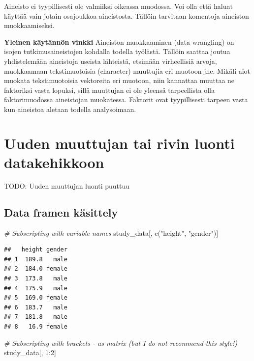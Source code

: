 \documentclass[
]{book}
\newenvironment{Shaded}{\begin{snugshade}}{\end{snugshade}}
\newcommand{\CommentTok}[1]{\textcolor[rgb]{0.56,0.35,0.01}{\textit{#1}}}
\newcommand{\DecValTok}[1]{\textcolor[rgb]{0.00,0.00,0.81}{#1}}
\newcommand{\FunctionTok}[1]{\textcolor[rgb]{0.00,0.00,0.00}{#1}}
\newcommand{\NormalTok}[1]{#1}
\newcommand{\SpecialCharTok}[1]{\textcolor[rgb]{0.00,0.00,0.00}{#1}}
\newcommand{\StringTok}[1]{\textcolor[rgb]{0.31,0.60,0.02}{#1}}
\begin{document}
Aineisto ei tyypillisesti ole valmiiksi oikeassa muodossa. Voi olla että haluat käyttää vain jotain osajoukkoa aineistosta. Tällöin tarvitaan komentoja aineiston muokkaamiseksi.

\textbf{Yleinen käytännön vinkki}
Aineiston muokkaaminen (data wrangling) on isojen tutkimusaineistojen kohdalla todella työlästä. Tällöin saattaa joutua yhdistelemään aineistoja useista lähteistä, etsimään virheellisiä arvoja, muokkaamaan tekstimuotoisia (character) muuttujia eri muotoon jne. Mikäli aiot muokata tekstimuotoisia vektoreita eri muotoon, niin kannattaa muuttaa ne faktoriksi vasta lopuksi, sillä muuttujan ei ole yleensä tarpeellista olla faktorimuodossa aineistojan muokatessa. Faktorit ovat tyypillisesti tarpeen vasta kun aineistoa aletaan todella analysoimaan.

\hypertarget{data-frame-wrangling}{%
\section{Uuden muuttujan tai rivin luonti datakehikkoon}\label{data-frame-wrangling}}

TODO: Uuden muuttujan luonti puuttuu

\hypertarget{data-framen-kuxe4sittely}{%
\subsection{Data framen käsittely}\label{data-framen-kuxe4sittely}}

\begin{Shaded}
\begin{Highlighting}[]
\CommentTok{\# Subscripting with variable names}
\NormalTok{study\_data[, }\FunctionTok{c}\NormalTok{(}\StringTok{"height"}\NormalTok{, }\StringTok{"gender"}\NormalTok{)]}
\end{Highlighting}
\end{Shaded}

\begin{verbatim}
##   height gender
## 1  189.8   male
## 2  184.0 female
## 3  173.8   male
## 4  175.9   male
## 5  169.0 female
## 6  183.7   male
## 7  181.8   male
## 8   16.9 female
\end{verbatim}

\begin{Shaded}
\begin{Highlighting}[]
\CommentTok{\# Subscripting with brackets {-} as matrix (but I do not recommend this style!)}
\NormalTok{study\_data[, }\DecValTok{1}\SpecialCharTok{:}\DecValTok{2}\NormalTok{]}
\end{Highlighting}
\end{Shaded}
\end{document}

